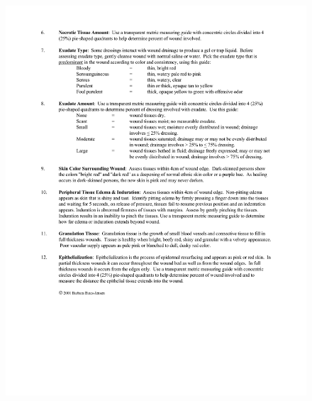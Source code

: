 \begin{figure}[H]
	\centering
	\includegraphics[keepaspectratio, width=14cm]{gambar/BWAT-2}
	\label{gambar:bwat_2}
\end{figure}

